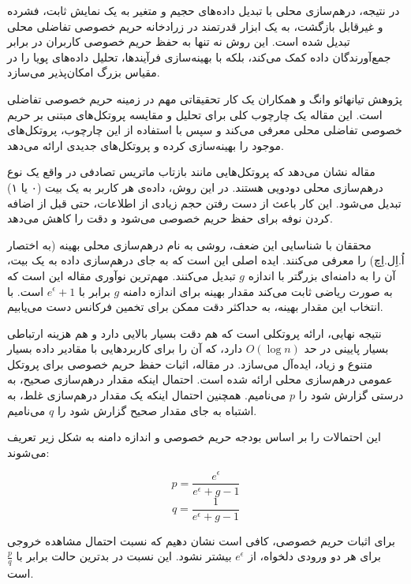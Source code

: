 
در نتیجه، درهم‌سازی محلی با تبدیل داده‌های حجیم و متغیر به یک نمایش ثابت، فشرده و غیرقابل بازگشت، به یک ابزار قدرتمند در زرادخانه حریم خصوصی تفاضلی محلی تبدیل شده است. این روش نه تنها به حفظ حریم خصوصی کاربران در برابر جمع‌آورندگان داده کمک می‌کند، بلکه با بهینه‌سازی فرآیندها، تحلیل داده‌های پویا را در مقیاس بزرگ امکان‌پذیر می‌سازد.


پژوهش تیانهائو وانگ و همکاران  یک کار تحقیقاتی مهم در زمینه حریم خصوصی تفاضلی است. این مقاله یک چارچوب کلی برای تحلیل و مقایسه پروتکل‌های مبتنی بر حریم خصوصی تفاضلی محلی معرفی می‌کند و سپس با استفاده از این چارچوب، پروتکل‌های موجود را بهینه‌سازی کرده و پروتکل‌های جدیدی ارائه می‌دهد.

مقاله نشان می‌دهد که پروتکل‌هایی مانند بازتاب ماتریس تصادفی در واقع یک نوع درهم‌سازی محلی دودویی هستند. در این روش، داده‌ی هر کاربر به یک بیت (۰ یا ۱) تبدیل می‌شود. این کار باعث از دست رفتن حجم زیادی از اطلاعات، حتی قبل از اضافه کردن نوفه برای حفظ حریم خصوصی می‌شود و دقت را کاهش می‌دهد.

محققان با شناسایی این ضعف، روشی به نام درهم‌سازی محلی بهینه (به اختصار اُ.اِل.اِچ) را معرفی می‌کنند. ایده اصلی این است که به جای درهم‌سازی داده به یک بیت، آن را به دامنه‌ای بزرگتر با اندازه $g$ تبدیل می‌کنند. مهم‌ترین نوآوری مقاله این است که به صورت ریاضی ثابت می‌کند مقدار بهینه برای اندازه دامنه $g$ برابر با $e^\epsilon + 1$ است. با انتخاب این مقدار بهینه، به حداکثر دقت ممکن برای تخمین فرکانس دست می‌یابیم.

نتیجه نهایی، ارائه پروتکلی است که هم دقت بسیار بالایی دارد و هم هزینه ارتباطی بسیار پایینی در حد $O(\log n)$ دارد، که آن را برای کاربردهایی با مقادیر داده بسیار متنوع و زیاد، ایده‌آل می‌سازد. در مقاله، اثبات حفظ حریم خصوصی برای پروتکل عمومی درهم‌سازی محلی ارائه شده است. احتمال اینکه مقدار درهم‌سازی صحیح، به درستی گزارش شود را $p$ می‌نامیم. همچنین احتمال اینکه یک مقدار درهم‌سازی غلط، به اشتباه به جای مقدار صحیح گزارش شود را $q$ می‌نامیم.

این احتمالات را بر اساس بودجه حریم خصوصی و اندازه دامنه به شکل زیر تعریف می‌شوند:

$$p = \frac{e^\epsilon}{e^\epsilon + g - 1}$$
$$q = \frac{1}{e^\epsilon + g - 1}$$


برای اثبات حریم خصوصی، کافی است نشان دهیم که نسبت احتمال مشاهده خروجی برای هر دو ورودی دلخواه، از $e^\epsilon$ بیشتر نشود. این نسبت در بدترین حالت برابر با $\frac{p}{q}$ است.

